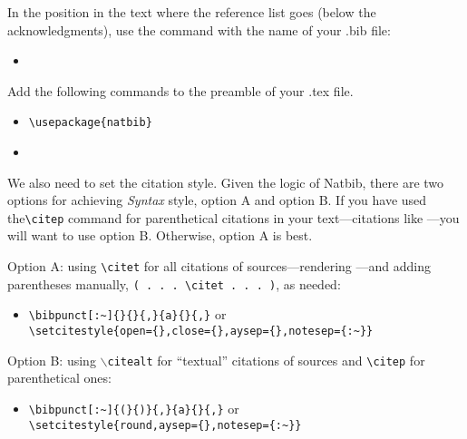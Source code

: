 \documentclass[letterpaper,12pt, twoside]{article}
\begin{document}
In the position in the text where the reference list goes (below the acknowledgments), use the \verb|| command with the name of your .bib file:

\begin{itemize}
\item  \verb||
\end{itemize}

Add the following commands to the preamble of your .tex file.

\begin{itemize}
\item  \verb|\usepackage{natbib}|
\item  \verb||
\end{itemize}

We also need to set the citation style. Given the logic of Natbib, there are two options for achieving \emph{Syntax} style, option A and option B.  If you have used the\verb|\citep| command for parenthetical citations in your text---citations like \citep{journalarticle,book,bookchapter,thesis,unpublished}---you will want to use option B. Otherwise, option A is best.

Option A: using \verb|\citet| for all citations of sources---rendering \citealt{journalarticle,book,bookchapter,thesis,unpublished}---and adding parentheses manually, \verb|( . . . \citet . . . )|, as needed:

\begin{itemize}
\item \verb|\bibpunct[:~]{}{}{,}{a}{}{,}| or\\ \verb|\setcitestyle{open={},close={},aysep={},notesep={:~}}|
\end{itemize}

Option B: using  \texttt{$\backslash$citealt} for ``textual'' citations of sources and \verb|\citep| for parenthetical ones:

\begin{itemize}
\item \verb|\bibpunct[:~]{(}{)}{,}{a}{}{,}| or\\ \verb|\setcitestyle{round,aysep={},notesep={:~}}|
\end{itemize}
\end{document}
